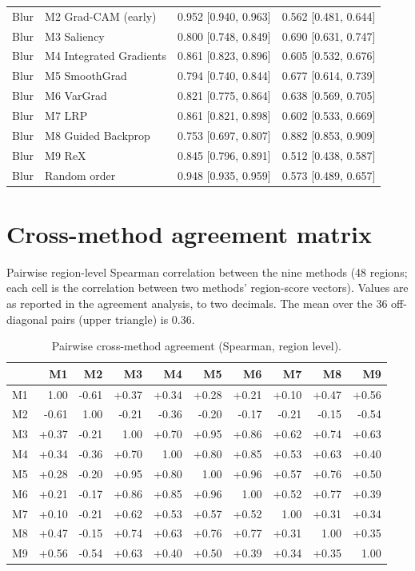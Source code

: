 \documentclass[11pt]{article}
\begin{document}
\begin{table}[H]
\begin{tabular}{llcc}
Blur & M2 Grad-CAM (early) & 0.952 [0.940, 0.963] & 0.562 [0.481, 0.644] \\
Blur & M3 Saliency & 0.800 [0.748, 0.849] & 0.690 [0.631, 0.747] \\
Blur & M4 Integrated Gradients & 0.861 [0.823, 0.896] & 0.605 [0.532, 0.676] \\
Blur & M5 SmoothGrad & 0.794 [0.740, 0.844] & 0.677 [0.614, 0.739] \\
Blur & M6 VarGrad & 0.821 [0.775, 0.864] & 0.638 [0.569, 0.705] \\
Blur & M7 LRP & 0.861 [0.821, 0.898] & 0.602 [0.533, 0.669] \\
Blur & M8 Guided Backprop & 0.753 [0.697, 0.807] & 0.882 [0.853, 0.909] \\
Blur & M9 ReX & 0.845 [0.796, 0.891] & 0.512 [0.438, 0.587] \\
Blur & Random order & 0.948 [0.935, 0.959] & 0.573 [0.489, 0.657] \\
\bottomrule
\end{tabular}
\end{table}

\section{Cross-method agreement matrix}
\label{app:agree}
Pairwise region-level Spearman correlation between the nine methods (48 regions; each cell is the correlation between
two methods' region-score vectors). Values are as reported in the agreement analysis, to two decimals.
The mean over the 36 off-diagonal pairs (upper triangle) is 0.36.

\begin{table}[H]
\centering
\small
\caption{Pairwise cross-method agreement (Spearman, region level).}
\label{tab:agree}
\begin{tabular}{l*{9}{r}}
\toprule
& M1 & M2 & M3 & M4 & M5 & M6 & M7 & M8 & M9 \\
\midrule
M1 & 1.00 & -0.61 & +0.37 & +0.34 & +0.28 & +0.21 & +0.10 & +0.47 & +0.56 \\
M2 & -0.61 & 1.00 & -0.21 & -0.36 & -0.20 & -0.17 & -0.21 & -0.15 & -0.54 \\
M3 & +0.37 & -0.21 & 1.00 & +0.70 & +0.95 & +0.86 & +0.62 & +0.74 & +0.63 \\
M4 & +0.34 & -0.36 & +0.70 & 1.00 & +0.80 & +0.85 & +0.53 & +0.63 & +0.40 \\
M5 & +0.28 & -0.20 & +0.95 & +0.80 & 1.00 & +0.96 & +0.57 & +0.76 & +0.50 \\
M6 & +0.21 & -0.17 & +0.86 & +0.85 & +0.96 & 1.00 & +0.52 & +0.77 & +0.39 \\
M7 & +0.10 & -0.21 & +0.62 & +0.53 & +0.57 & +0.52 & 1.00 & +0.31 & +0.34 \\
M8 & +0.47 & -0.15 & +0.74 & +0.63 & +0.76 & +0.77 & +0.31 & 1.00 & +0.35 \\
M9 & +0.56 & -0.54 & +0.63 & +0.40 & +0.50 & +0.39 & +0.34 & +0.35 & 1.00 \\
\bottomrule
\end{tabular}
\end{table}
\end{document}
